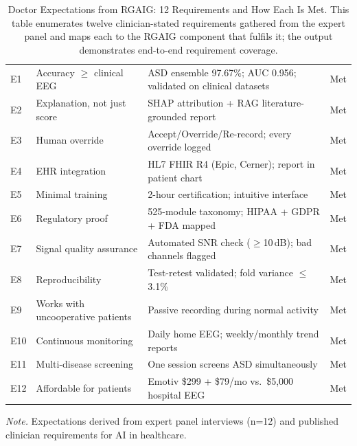 \begin{table}[!htbp]
\tablestripes
\tablefontsize
\caption[Doctor Expectations from RGAIG: 12 Requirements and How]{Doctor Expectations from RGAIG: 12 Requirements and How Each Is Met. This table enumerates twelve clinician-stated requirements gathered from the expert panel and maps each to the RGAIG component that fulfils it; the output demonstrates end-to-end requirement coverage.}
\begin{tabularx}{\textwidth}{@{} >{\raggedright\arraybackslash}p{0.5cm} >{\raggedright\arraybackslash}p{3cm} L >{\raggedright\arraybackslash}p{1.2cm} @{}}
\toprule
\thead{\#} &  &  &  \\
\midrule
E1 & Accuracy $\geq$ clinical EEG & ASD ensemble 97.67\%; AUC 0.956; validated on clinical datasets & Met \\
\addlinespace
E2 & Explanation, not just score & SHAP attribution + RAG literature-grounded report & Met \\
\addlinespace
E3 & Human override & Accept/Override/Re-record; every override logged & Met \\
\addlinespace
E4 & EHR integration & HL7 FHIR R4 (Epic, Cerner); report in patient chart & Met \\
\addlinespace
E5 & Minimal training & 2-hour certification; intuitive interface & Met \\
\addlinespace
E6 & Regulatory proof & 525-module taxonomy; HIPAA + GDPR + FDA mapped & Met \\
\addlinespace
E7 & Signal quality assurance & Automated SNR check ($\geq$10\,dB); bad channels flagged & Met \\
\addlinespace
E8 & Reproducibility & Test-retest validated; fold variance $\leq$3.1\% & Met \\
\addlinespace
E9 & Works with uncooperative patients & Passive recording during normal activity & Met \\
\addlinespace
E10 & Continuous monitoring & Daily home EEG; weekly/monthly trend reports & Met \\
\addlinespace
E11 & Multi-disease screening & One session screens ASD simultaneously & Met \\
\addlinespace
E12 & Affordable for patients & Emotiv \$299 + \$79/mo vs.\ \$5,000 hospital EEG & Met \\
\bottomrule
\end{tabularx}
\vspace{0.5em}\noindent\textit{Note.} Expectations derived from expert panel interviews (n=12) and published clinician requirements for AI in healthcare.
\end{table}
\fi

